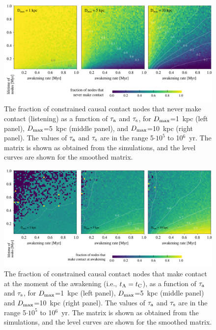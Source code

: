 \documentclass[crop]{CSLB}
\begin{document}
\begin{figure} %
   \centering
   \includegraphics[width=\textwidth]{F_never_contact.pdf}
   \caption{
The fraction of constrained causal contact nodes that never make contact (listening) as a
   function of $\tau_{\rm a}$ and $\tau_{\rm s}$, for 
$D_{\rm max}$=1~kpc (left panel),
$D_{\rm max}$=5~kpc (middle panel), and
$D_{\rm max}$=10~kpc (right panel).
%
The values of $\tau_{\rm a}$ and $\tau_{\rm s}$ are in the range
   5$\cdot10^5$ to 10$^6$~yr.
%
The matrix is shown as obtained from the simulations, and the level
   curves are shown for the smoothed matrix.
%
   }
   \label{F_never_contact}
\end{figure}
 
\begin{figure} %
   \centering
   \includegraphics[width=\textwidth]{F_C_at_A.pdf}
   \caption{
The fraction of constrained causal contact nodes that make contact at the moment of the
   awakening (i.e., $t_{\rm A}=t_{\rm C}$), as a function of $\tau_{\rm a}$ and $\tau_{\rm s}$, for
$D_{\rm max}$=1~kpc (left panel),
$D_{\rm max}$=5~kpc (middle panel) and
$D_{\rm max}$=10~kpc (right panel).
%
The values of $\tau_{\rm a}$ and $\tau_{\rm s}$ are in the range
   5$\cdot10^5$ to 10$^6$~yr.
%
The matrix is shown as obtained from the simulations, and the level
   curves are shown for the smoothed matrix.
   }
   \label{F_C_at_A}
\end{figure}
\end{document}
